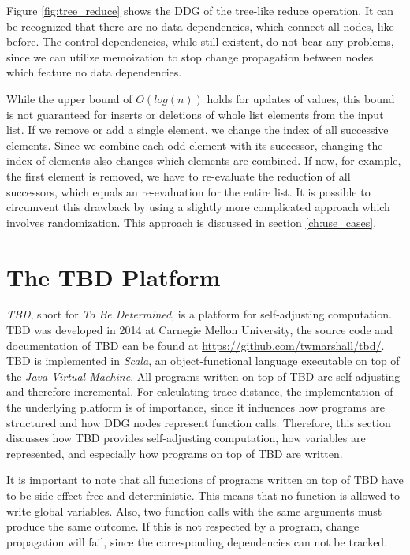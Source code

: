 Figure \ref{fig:tree_reduce} shows the DDG of the tree-like reduce operation. It can be recognized that there are no data dependencies, which connect all nodes, like before. The control dependencies, while still existent, do not bear any problems, since we can utilize memoization to stop change propagation between nodes which feature no data dependencies. 

While the upper bound of $O(log(n))$ holds for updates of values, this bound is not guaranteed for inserts or deletions of whole list elements from the input list. If we remove or add a single element, we change the index of all successive elements. Since we combine each odd element with its successor, changing the index of elements also changes which elements are combined. If now, for example, the first element is removed, we have to re-evaluate the reduction of all successors, which equals an re-evaluation for the entire list. 
It is possible to circumvent this drawback by using a slightly more complicated approach which involves randomization. This approach is discussed in section \ref{ch:use_cases}. 

\chapter{The TBD Platform}
\label{ch:tbd_platform}

\textit{TBD}, short for \textit{To Be Determined}, is a platform for self-adjusting computation. TBD was developed in 2014 at Carnegie Mellon University, the source code and documentation of TBD can be found at \url{https://github.com/twmarshall/tbd/}. TBD is implemented in \textit{Scala}, an object-functional language executable on top of the \textit{Java Virtual Machine}. All programs written on top of TBD are self-adjusting and therefore incremental. For calculating trace distance, the implementation of the underlying platform is of importance, since it influences how programs are structured and how DDG nodes represent function calls. Therefore, this section discusses how TBD provides self-adjusting computation, how variables are represented, and especially how programs on top of TBD are written. 

It is important to note that all functions of programs written on top of TBD have to be side-effect free and deterministic. This means that no function is allowed to write global variables. Also, two function calls with the same arguments must produce the same outcome. If this is not respected by a program, change propagation will fail, since the corresponding dependencies can not be tracked. 

